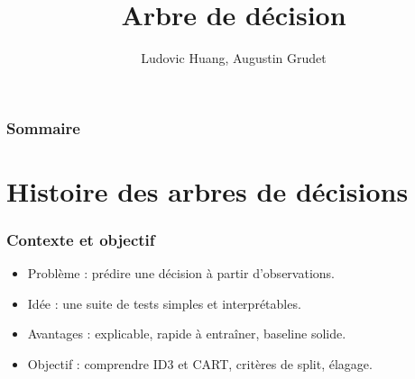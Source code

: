 \documentclass{beamer}
\title{Arbre de décision}
\author{Ludovic Huang, Augustin Grudet}
\date{}
\begin{document}
\begin{frame}
	\titlepage
\end{frame}

\begin{frame}
	\frametitle{Sommaire}
    \tableofcontents
\end{frame}


\section{Histoire des arbres de décisions}

\begin{frame}
	\frametitle{Contexte et objectif}
	\begin{itemize}
		\item Problème : prédire une décision à partir d'observations.
		\item Idée : une suite de tests simples et interprétables.
		\item Avantages : explicable, rapide à entraîner, baseline solide.
		\item Objectif : comprendre ID3 et CART, critères de split, élagage.
	\end{itemize}
\end{frame}
\end{document}
